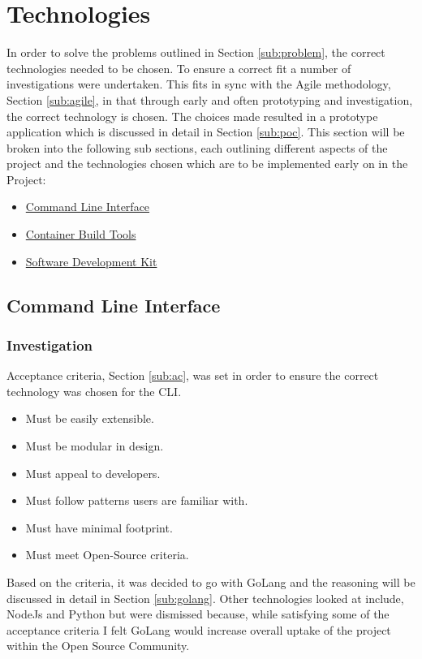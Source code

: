\section{Technologies}
In order to solve the problems outlined in Section \ref{sub:problem}, the correct technologies needed to be chosen. To ensure a correct fit a number of investigations were undertaken. This fits in sync with the Agile methodology, Section \ref{sub:agile}, in that through early and often prototyping and investigation, the correct technology is chosen. The choices made resulted in a prototype application which is discussed in detail in Section \ref{sub:poc}. This section will be broken into the following sub sections, each outlining different aspects of the project and the technologies chosen which are to be implemented early on in the Project: 
\begin{itemize}
    \item \hyperref[sub:cli_stack]{Command Line Interface}
    \item \hyperref[sub:build_invest]{Container Build Tools}
    \item \hyperref[sub:sdk_stack]{Software Development Kit}
\end{itemize}

\subsection{Command Line Interface}
\label{sub:cli_stack}
\subsubsection{Investigation}
\label{sub:cli_inves}
Acceptance criteria, Section \ref{sub:ac}, was set in order to ensure the correct technology was chosen for the \gls{CLI}.
\begin{itemize}
    \item Must be easily extensible.  
    \item Must be modular in design.
    \item Must appeal to developers.
    \item Must follow patterns users are familiar with.
    \item Must have minimal footprint.
    \item Must meet \gls{Open-Source} criteria.
\end{itemize}
Based on the criteria, it was decided to go with \gls{GoLang} and the reasoning will be discussed in detail in Section \ref{sub:golang}. Other technologies looked at include, NodeJs and Python but were dismissed because, while satisfying some of the acceptance criteria I felt GoLang would increase overall uptake of the project within the Open Source Community.

